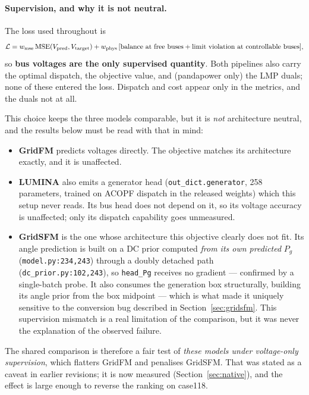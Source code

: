 \documentclass[10pt]{article}
\begin{document}
\paragraph{Supervision, and why it is not neutral.}
\label{par:supervision}
The loss used throughout is
\[
\mathcal{L} = w_{\rm mse}\,\mathrm{MSE}(V_{\rm pred}, V_{\rm target})
 + w_{\rm phys}\,[\text{balance at free buses} + \text{limit violation at controllable buses}],
\]
so \textbf{bus voltages are the only supervised quantity}. Both pipelines also
carry the optimal dispatch, the objective value, and (pandapower only) the LMP
duals; none of these entered the loss. Dispatch and cost appear only in the
metrics, and the duals not at all.

This choice keeps the three models comparable, but it is \emph{not} architecture
neutral, and the results below must be read with that in mind:

\begin{itemize}\itemsep2pt
\item \textbf{GridFM} predicts voltages directly. The objective matches its
architecture exactly, and it is unaffected.
\item \textbf{LUMINA} also emits a generator head (\texttt{out\_dict.generator},
258 parameters, trained on ACOPF dispatch in the released weights) which this
setup never reads. Its bus head does not depend on it, so its voltage accuracy
is unaffected; only its dispatch capability goes unmeasured.
\item \textbf{GridSFM} is the one whose architecture this objective clearly does
not fit. Its angle prediction is built on a DC prior computed \emph{from its own
predicted} \(P_g\) (\texttt{model.py:234,243}) through a doubly detached path
(\texttt{dc\_prior.py:102,243}), so \texttt{head\_Pg} receives no gradient ---
confirmed by a single-batch probe. It also consumes the generation box
structurally, building its angle prior from the box midpoint --- which is what
made it uniquely sensitive to the conversion bug described in
Section~\ref{sec:gridsfm}. This supervision mismatch is a real limitation of the
comparison, but it was never the explanation of the observed failure.
\end{itemize}

The shared comparison is therefore a fair test of \emph{these models under
voltage-only supervision}, which flatters GridFM and penalises GridSFM. That was
stated as a caveat in earlier revisions; it is now measured
(Section~\ref{sec:native}), and the effect is large enough to reverse the
ranking on case118.
\end{document}
